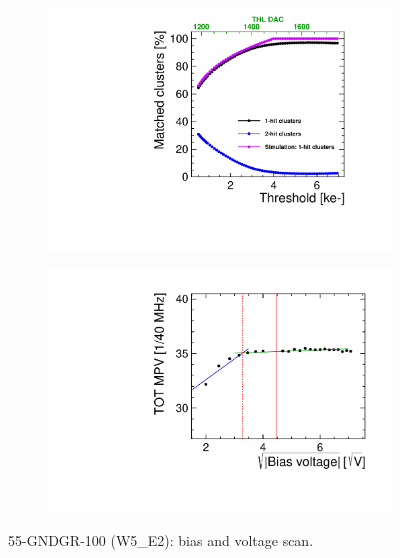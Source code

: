 \begin{figure}[htbp] \centering
  \begin{subfigure}[b]{0.45\textwidth}
    \includegraphics[width=\textwidth]{./figures/TestBeam/ThresholdScan_W0005_E02.pdf}
    \caption{}
  \end{subfigure} \hfill
  \begin{subfigure}[b]{0.45\textwidth}
    \includegraphics[width=\textwidth]{./figures/TestBeam/depletionVoltage_W0005_E02.pdf}
    \caption{}
  \end{subfigure}
  \caption{55-GNDGR-100 (W5\_E2): bias and voltage scan.}
  \label{fig:Timepix3_THLscan_Vdep_E2}
\end{figure}


